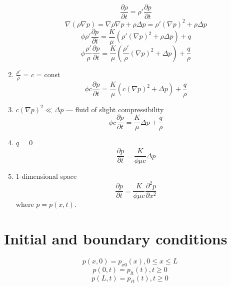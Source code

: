 \documentclass{article}
\begin{document}
\begin{enumerate}
\begin{equation}
\frac{\partial \rho}{\partial t} = \rho' \frac{\partial p}{\partial t}
\end{equation}
\begin{equation}
\nabla (\rho \nabla p) = \nabla \rho \nabla p + \rho \Delta p = \rho' (\nabla
p)^2 + \rho \Delta p
\end{equation}
\begin{equation}
\phi \rho' \frac{\partial p}{\partial t} = \frac{K}{\mu} \left(\rho' (\nabla
p)^2 + \rho \Delta p \right) + q
\end{equation}
\begin{equation}
\phi \frac{\rho'}{\rho} \frac{\partial p}{\partial t} = \frac{K}{\mu}
\left(\frac{\rho'}{\rho} (\nabla p)^2 + \Delta p \right) + \frac{q}{\rho}
\end{equation}
\item $\frac{\rho'}{\rho}$ = $c$ = const
\begin{equation}
\phi c \frac{\partial p}{\partial t} = \frac{K}{\mu} \left(c (\nabla p)^2 +
\Delta p \right) + \frac{q}{\rho}
\end{equation}
\item $c (\nabla p)^2 \ll \Delta p$ --- fluid of slight compressibility
\begin{equation}
\phi c \frac{\partial p}{\partial t} = \frac{K}{\mu} \Delta p + \frac{q}{\rho}
\end{equation}
\item $q$ = 0
\begin{equation}
\frac{\partial p}{\partial t} = \frac{K}{\phi \mu c} \Delta p
\end{equation}
\item 1-dimensional space
\begin{equation}
\frac{\partial p}{\partial t} = \frac{K}{\phi \mu c} \frac{\partial^2
p}{\partial x^2}
\end{equation}
where $p = p(x, t)$.
\end{enumerate}

\section{Initial and boundary conditions}
\begin{equation}
p(x, 0) = p_{x 0}(x), 0 \leq x \leq L
\end{equation}
\begin{equation}
p(0, t) = p_{l t}(t), t \geq 0
\end{equation}
\begin{equation}
p(L, t) = p_{r t}(t), t \geq 0
\end{equation}


\end{document}

